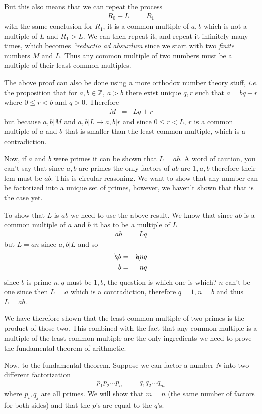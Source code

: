 \documentclass[aps,preprint,preprintnumbers,nofootinbib,showpacs,prd]{revtex4-1}
\newcommand{\ie}{{\it i.e.} }
\newcommand{\nbea}{\begin{eqnarray*}}
\newcommand{\neea}{\end{eqnarray*}}
\begin{document}
But this also means that we can repeat the process
%
\nbea
R_0 - L & = & R_1
\neea
%
with the same conclusion for $R_1$, it is a common multiple of $a,b$ which is not a multiple of $L$ and $R_1 > L$. We can then repeat it, and repeat it infinitely many times, which becomes {\it ``reductio ad absurdum} since we start with two {\it finite} numbers $M$ and $L$. Thus any common multiple of two numbers must be a multiple of their least common multiples.

The above proof can also be done using a more orthodox number theory stuff, \ie the proposition that for $a,b \in \mathbb{Z}, ~a>b$ there exist unique $q, r$ such that $a = bq + r$ where $0 \le r < b$ and $q > 0$. Therefore
%
\nbea
M & = & Lq + r
\neea
%
but because $a,b|M$ and $a,b|L \longrightarrow a,b|r$ and since $0 \le r < L$, $r$ is a common multiple of $a$ and $b$ that is smaller than the least common multiple, which is a contradiction.

Now, if $a$ and $b$ were primes it can be shown that $L=ab$. A word of caution, you can't say that since $a,b$ are primes the only factors of $ab$ are $1,a,b$ therefore their lcm must be $ab$. This is circular reasoning. We want to show that any number can be factorized into a unique set of primes, however, we haven't shown that that is the case yet.

To show that $L$ is $ab$ we need to use the above result. We know that since $ab$ is a common multiple of $a$ and $b$ it has to be a multiple of $L$
%
\nbea
ab & = & Lq
\neea
%
but $L = an$ since $a,b|L$ and so
%
\nbea
\bcancel{a}b & = & \bcancel{a}nq \\
b & = & nq
\neea
%
since $b$ is prime $n,q$ must be $1,b$, the question is which one is which? $n$ can't be one since then $L=a$ which is a contradiction, therefore $q=1, n=b$ and thus $L=ab$.

We have therefore shown that the least common multiple of two primes is the product of those two. This combined with the fact that any common multiple is a multiple of the least common multiple are the only ingredients we need to prove the fundamental theorem of arithmetic.

Now, to the fundamental theorem. Suppose we can factor a number $N$ into two different factorization
%
\nbea
p_1 p_2 \dots p_n & = & q_1 q_2 \dots q_m
\neea
%
where $p_i, q_j$ are all primes. We will show that $m=n$ (the same number of factors for both sides) and that the $p$'s are equal to the $q$'s.
\end{document}

